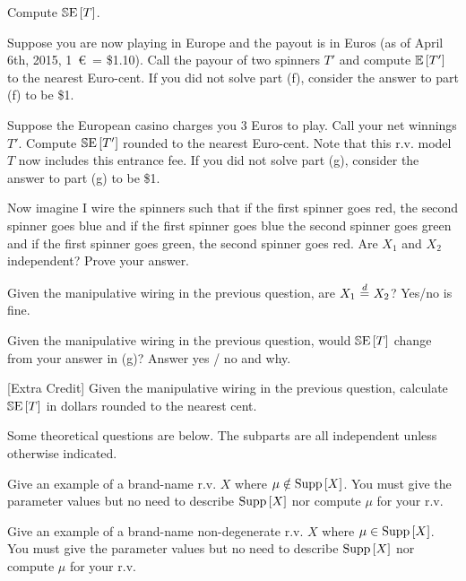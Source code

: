 \documentclass[12pt]{article}
\begin{document}
 Compute $\mathbb{S}\text{E}\left[T\right]$. 

 Suppose you are now playing in Europe and the payout is in Euros (as of April 6th, 2015, 1~\euro~= \$1.10). Call the payour of two spinners $T'$ and compute $\mathbb{E}\left[T'\right]$ to the nearest Euro-cent. If you did not solve part (f), consider the answer to part (f) to be \$1. 

 Suppose the European casino charges you 3 Euros to play. Call your net winnings $T'$. Compute $\mathbb{S}\text{E}\left[T'\right]$ rounded to the nearest Euro-cent. Note that this r.v. model $T$ now includes this entrance fee. If you did not solve part (g), consider the answer to part (g) to be \$1. 

 Now imagine I wire the spinners such that if the first spinner goes red, the second spinner goes blue and if the first spinner goes blue the second spinner goes green and if the first spinner goes green, the second spinner goes red. Are $X_1$ and $X_2$ independent? Prove your answer. 


 Given the manipulative wiring in the previous question, are $X_1 \equalsindist X_2$? Yes/no is fine. 

 Given the manipulative wiring in the previous question, would $\mathbb{S}\text{E}\left[T\right]$ change from your answer in (g)? Answer yes / no and why. 

 [Extra Credit] Given the manipulative wiring in the previous question, calculate $\mathbb{S}\text{E}\left[T\right]$ in dollars rounded to the nearest cent. 

\eenum


\problem Some theoretical questions are below. The subparts are all independent unless
otherwise indicated.

\benum

 Give an example of a brand-name r.v. $X$ where $\mu \notin \text{Supp}\left[X\right]$. You must give the parameter values but no need to describe $\text{Supp}\left[X\right]$ nor compute $\mu$ for your r.v. 

 Give an example of a brand-name non-degenerate r.v. $X$ where $\mu \in \text{Supp}\left[X\right]$. You must give the parameter values but no need to describe $\text{Supp}\left[X\right]$ nor compute $\mu$ for your r.v. 


\end{document}
